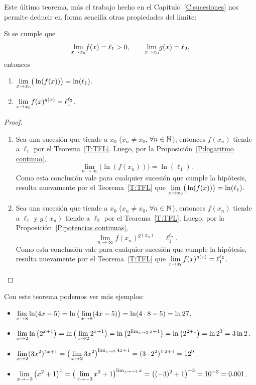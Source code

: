 Este último teorema, más el trabajo hecho en el Capítulo~\ref{C:sucesiones} nos permite deducir en forma sencilla otras propiedades del límite:

\begin{proposition}
Si se cumple que
\[
{\lim_{x\to x_0}} f(x)=\ell_1>0,
\qquad
{\ensuremath{\lim_{x\to x_0}}} g(x)=\ell_2,
\]
entonces
\begin{enumerate}[{\bf (a)}]
    \item $\displaystyle {\ensuremath{\lim_{x\to x_0}}} \big( \ln(f(x)) \big) = \ln (\ell_1)$.
    \item $\displaystyle {\ensuremath{\lim_{x\to x_0}}} f(x)^{g(x)} = \ell_1^{\ell_2}$.
\end{enumerate}
\end{proposition}

\begin{proof}
\begin{enumerate}[{\bf (a)}]
    \item Sea \sucxn una sucesión que tiende a $x_0$ ($x_n\neq x_0$, $\forall {\ensuremath{n\in\mathbb{N}}}$),
    entonces $f(x_n)$ tiende a $\ell_1$ por el Teorema~\ref{T:TFL}. 
    Luego, por la Proposición~\ref{P:logaritmo continuo}, 
    \[
    \lim_{n\to\infty} \big(\ln (f(x_n))\big) = \ln (\ell_1).
    \]
    Como esta conclusión vale para cualquier sucesión \sucxn que cumple la hipótesis, 
    resulta nuevamente por el Teorema~\ref{T:TFL} que $\displaystyle{\ensuremath{\lim_{x\to x_0}}} \big( \ln (f(x)) \big) = \ln (\ell_1)$.
    
    \item Sea \sucxn una sucesión que tiende a $x_0$ ($x_n\neq x_0$, $\forall {\ensuremath{n\in\mathbb{N}}}$),
    entonces $f(x_n)$ tiende a $\ell_1$ y $g(x_n)$ tiende a $\ell_2$ por el Teorema~\ref{T:TFL}. 
    Luego, por la Proposición~\ref{P:potencias continuas}, 
    \[
    \lim_{n\to\infty} f(x_n)^{g(x_n)} = \ell_1^{\ell_2}.
    \]
    Como esta conclusión vale para cualquier sucesión \sucxn que cumple la hipótesis, 
    resulta nuevamente por el Teorema~\ref{T:TFL} que $\displaystyle {\ensuremath{\lim_{x\to x_0}}} f(x)^{g(x)} = \ell_1^{\ell_2}$.\qedhere
\end{enumerate}
\end{proof}


\begin{example}
    Con este teorema podemos ver más ejemplos:
    \begin{itemize}
        \item $\displaystyle \lim_{x \to 8} \ln(4x-5) = \ln\big(\lim_{x\to 8} (4x-5)\big)=\ln (4\cdot 8-5) = \ln 27$.
        \item $\displaystyle \lim_{x \to 2} \ln \big( 2^{x+1} \big)
        = \ln \big( \lim_{x \to 2}  2^{x+1} \big)
        = \ln \big(   2^{\lim_{x \to 2} x+1} \big)
        = \ln \big(   2^{2+1} \big) = \ln 2^3 = 3 \ln 2
        $.
        \item $\displaystyle \lim_{x \to 2} (3x^2)^{4x+1} 
        = \big(\lim_{x \to 2}3x^2\big)^{\lim_{x \to 2}4x+1} 
        = (3\cdot2^2)^{4\cdot 2 + 1 }
        = 12^{9}
        $.
        \item $\displaystyle \lim_{x \to -3} \big(x^2+1\big)^x
        = \big(\lim_{x \to -3}x^2+1\big)^{\lim_{x \to -3}x}
        = \big((-3)^2+1\big)^{-3}
        = 10^{-3} = 0.001
        $.
    \end{itemize}
\end{example}


